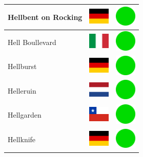 \documentclass[12pt, a4paper, twoside]{report}
\begin{document}
\begin{center}
\begin{longtable}{|p{5cm}|p{2cm}|p{2cm}|}
 Hellbent on Rocking                                        & \includegraphics[width=1cm]{../img/flags/de} &   \includegraphics[width=1cm]{../likes/y} \\ \hline
 Hell Boullevard                                            & \includegraphics[width=1cm]{../img/flags/it} &   \includegraphics[width=1cm]{../likes/y} \\ \hline
 Hellburst                                                  & \includegraphics[width=1cm]{../img/flags/de} &   \includegraphics[width=1cm]{../likes/y} \\ \hline
 Helleruin                                                  & \includegraphics[width=1cm]{../img/flags/nl} &   \includegraphics[width=1cm]{../likes/y} \\ \hline
 Hellgarden                                                 & \includegraphics[width=1cm]{../img/flags/cl} &   \includegraphics[width=1cm]{../likes/y} \\ \hline
 Hellknife                                                  & \includegraphics[width=1cm]{../img/flags/de} &   \includegraphics[width=1cm]{../likes/y} \\ \hline

\end{longtable}
\end{center}
\end{document}
